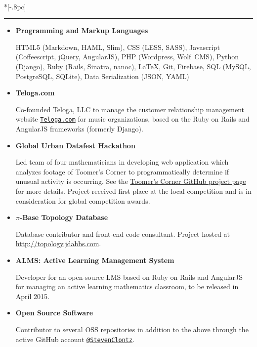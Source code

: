 \documentclass{article}
\newcommand{\headerText}[1]{
  \noindent{\large \bf #1} \\*[-.8pc]
  \rule{\textwidth}{.1pt}}
\begin{document}
\vfill


\headerText{Software Development}
\begin{itemize}
  \item
    \textbf{Programming and Markup Languages}

    HTML5 (Markdown, HAML, Slim), CSS (LESS, SASS),
    Javascript (Coffeescript, jQuery, AngularJS),
    PHP (Wordpress, Wolf~CMS), Python (Django), Ruby (Rails, Sinatra, nanoc),
    \LaTeX{}, Git, Firebase, SQL (MySQL, PostgreSQL, SQLite),
    Data Serialization (JSON, YAML)
  \item
    \textbf{Teloga.com}

    Co-founded Teloga, LLC to manage the customer relationship management
    website
    \href{https://teloga.com}{\nolinkurl{Teloga.com}} for music organizations,
    based on the Ruby on Rails and AngularJS frameworks (formerly Django).
  \item
    \textbf{Global Urban Datafest Hackathon}

    Led team of four mathematicians in developing web application
    which analyzes footage of Toomer's Corner to programmatically
    determine if unusual activity is occurring.
    See the
    \href{https://istoomerscornerbeingrolledrightnow.github.io}{
    Toomer's Corner GitHub project page} for more details. Project
    received first place at the local competition and is in consideration
    for global competition awards.
  \item
    \textbf{$\pi$-Base Topology Database}

    Database contributor and front-end code consultant. Project hosted at
    \url{http://topology.jdabbs.com}.
  \item
    \textbf{ALMS: Active Learning Management System}

    Developer for an open-source LMS based on Ruby on Rails and
    AngularJS for managing an active learning
    mathematics classroom, to be released in April 2015.
  \item
    \textbf{Open Source Software}

    Contributor to several OSS repositories in addition to the above
    through the active GitHub account
    \href{https://github.com/StevenClontz}{\nolinkurl{@StevenClontz}}.
\end{itemize}


\vfill
\end{document}

